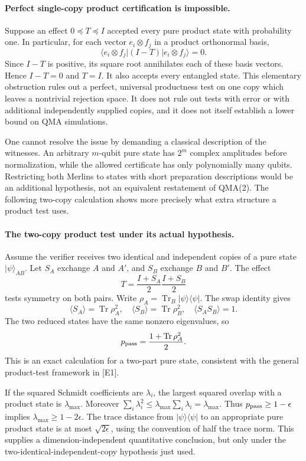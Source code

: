 \documentclass[11pt]{article}
\begin{document}
\paragraph{Perfect single-copy product certification is impossible.}
Suppose an effect $0\preceq T\preceq I$ accepted every pure product
state with probability one. In particular, for each vector $e_i\otimes
f_j$ in a product orthonormal basis,
\[
 \langle e_i\otimes f_j|(I-T)|e_i\otimes f_j\rangle=0.
\]
Since $I-T$ is positive, its square root annihilates each of these
basis vectors. Hence $I-T=0$ and $T=I$. It also accepts every
entangled state. This elementary obstruction rules out a perfect,
universal productness test on one copy which leaves a nontrivial
rejection space. It does not rule out tests with error or with additional
independently supplied copies, and it does not itself establish a
lower bound on QMA simulations.

One cannot resolve the issue by demanding a classical description of
the witnesses. An arbitrary $m$-qubit pure state has $2^m$ complex
amplitudes before normalization, while the allowed certificate has
only polynomially many qubits. Restricting both Merlins to states with
short preparation descriptions would be an additional hypothesis, not
an equivalent restatement of QMA(2). The following two-copy calculation
shows more precisely what extra structure a product test uses.

\paragraph{The two-copy product test under its actual hypothesis.}
Assume the verifier receives two identical and independent copies of a
pure state $|\psi\rangle_{AB}$. Let $S_A$ exchange $A$ and $A'$, and
$S_B$ exchange $B$ and $B'$. The effect
\[
 T=\frac{I+S_A}{2}\frac{I+S_B}{2}
\]
tests symmetry on both pairs. Write $\rho_A=\operatorname{Tr}_B
|\psi\rangle\langle\psi|$. The swap identity gives
\[
 \langle S_A\rangle=\operatorname{Tr}\rho_A^2,
 \quad \langle S_B\rangle=\operatorname{Tr}\rho_B^2,
 \quad \langle S_AS_B\rangle=1.
\]
The two reduced states have the same nonzero eigenvalues, so
\begin{equation}\label{a263:producttest}
 p_{\rm pass}=\frac{1+\operatorname{Tr}\rho_A^2}{2}.
\end{equation}
This is an exact calculation for a two-part pure state, consistent
with the general product-test framework in [E1].

If the squared Schmidt coefficients are $\lambda_i$, the largest
squared overlap with a product state is $\lambda_{\max}$. Moreover
$\sum_i\lambda_i^2\le\lambda_{\max}\sum_i\lambda_i
=\lambda_{\max}$. Thus $p_{\rm pass}\ge1-\epsilon$ implies
$\lambda_{\max}\ge1-2\epsilon$. The trace distance from
$|\psi\rangle\langle\psi|$ to an appropriate pure product state is
at most $\sqrt{2\epsilon}$, using the convention of half the trace
norm. This supplies a dimension-independent quantitative conclusion,
but only under the two-identical-independent-copy hypothesis just used.
\end{document}
